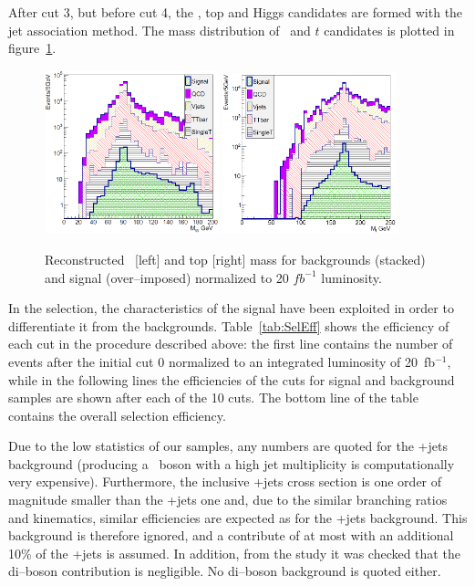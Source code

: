 After cut 3, but before cut 4, the \W, top and Higgs candidates are formed with the jet association method. The mass distribution of \W~and $t$ candidates is plotted in figure~\ref{fig:MWMTop}.

\begin{figure}[!Hhtbp]
  \begin{center}
    \includegraphics[width=0.45\textwidth]{figs/Pheno/MW.png}
    \includegraphics[width=0.45\textwidth]{figs/Pheno/Mtop.png}
    \caption{Reconstructed \W~[left] and top [right] mass for backgrounds (stacked) and signal (over--imposed) normalized to 20 $fb^{-1}$ luminosity.}
    \label{fig:MWMTop}
  \end{center}
\end{figure}

In the selection, the characteristics of the signal have been exploited in order to differentiate it from the backgrounds. Table~\ref{tab:SelEff} shows the efficiency of each cut in the procedure described above: the first line contains the number of events after the initial cut 0 normalized to an integrated luminosity of 20~fb$^{-1}$, while in the following lines the efficiencies of the cuts for signal and background samples are shown after each of the 10 cuts. The bottom line of the table contains the overall selection efficiency. 

Due to the low statistics of our samples, any numbers are quoted for the \Z+jets background (producing a \Z~boson with a high jet multiplicity is computationally very expensive). Furthermore, the inclusive \Z+jets cross section is one order of magnitude smaller than the \W+jets one and, due to the similar branching ratios and kinematics, similar efficiencies are expected as for the \W+jets background. This background is therefore ignored, and a contribute of at most with an additional 10\% of the \W+jets is assumed. In addition, from the study it was checked that the di--boson contribution is negligible. No di--boson background is quoted either.

